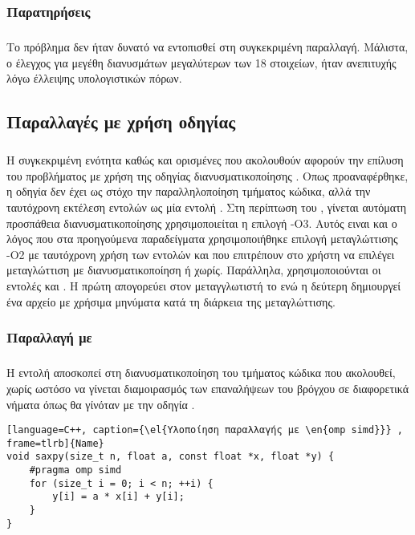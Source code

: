 \subsubsection{Παρατηρήσεις}
\subparagraph{}
Το πρόβλημα \emph{} δεν ήταν δυνατό να εντοπισθεί στη
συγκεκριμένη παραλλαγή. Μάλιστα, 
ο έλεγχος για μεγέθη διανυσμάτων μεγαλύτερων των 18 στοιχείων, ήταν ανεπιτυχής λόγω έλλειψης υπολογιστικών πόρων.

\subsection{Παραλλαγές με χρήση οδηγίας \emph{}}
\subparagraph{}
Η συγκεκριμένη ενότητα καθώς και ορισμένες που ακολουθούν αφορούν την επίλυση του προβλήματος  με χρήση της οδηγίας διανυσματικοποίησης \textbf{}. Οπως προαναφέρθηκε, η οδηγία δεν έχει ως στόχο την παραλληλοποίηση τμήματος κώδικα, αλλά την ταυτόχρονη εκτέλεση εντολών ως μία εντολή . Στη περίπτωση του , γίνεται αυτόματη προσπάθεια διανυσματικοποίησης χρησιμοποιείται η επιλογή -Ο3. Αυτός ειναι και ο λόγος που στα προηγούμενα παραδείγματα χρησιμοποιήθηκε επιλογή μεταγλώττισης -Ο2 με ταυτόχρονη χρήση των εντολών  και 
 που επιτρέπουν στο χρήστη να επιλέγει μεταγλώττιση με διανυσματικοποίηση ή χωρίς. Παράλληλα, χρησιμοποιούνται οι εντολές  και . Η πρώτη απογορεύει στον μεταγγλωτιστή το  ενώ η δεύτερη δημιουργεί ένα αρχείο με χρήσιμα μηνύματα κατά τη διάρκεια της μεταγλώττισης.

\subsubsection{Παραλλαγή με \emph{}}
\subparagraph{}
Η εντολή  αποσκοπεί στη διανυσματικοποίηση του τμήματος κώδικα που ακολουθεί, χωρίς ωστόσο να γίνεται διαμοιρασμός των επαναλήψεων του βρόγχου σε διαφορετικά νήματα όπως θα γίνόταν με την οδηγία .
\begin{spacing}{0.9}
\begin{lstlisting}[language=C++, caption={\el{Υλοποίηση παραλλαγής με \en{omp simd}}} , frame=tlrb]{Name}
void saxpy(size_t n, float a, const float *x, float *y) {
    #pragma omp simd
    for (size_t i = 0; i < n; ++i) {
        y[i] = a * x[i] + y[i];
    }
}
\end{lstlisting}
\end{spacing}


